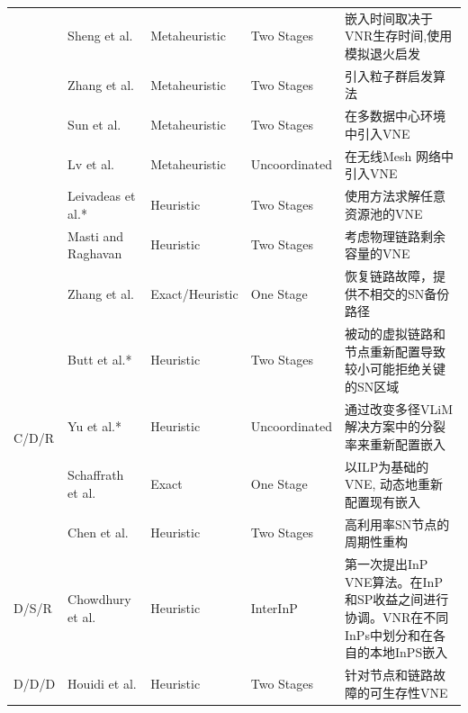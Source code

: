 \begin{longtable}[h]{@{}lm{}m{}m{}m{}}
 & Sheng et al.  \cite{zhang2011fell}  & Metaheuristic & Two Stages & 嵌入时间取决于VNR生存时间,使用模拟退火启发\\
 & Zhang et al.  \cite{zhang2013unified}  & Metaheuristic & Two Stages & 引入粒子群启发算法\\
 & Sun et al.  \cite{sun2012optimal}  & Metaheuristic & Two Stages & 在多数据中心环境中引入VNE\\
 & Lv et al.  \cite{lv2012virtual}  & Metaheuristic & Uncoordinated & 在无线Mesh 网络中引入VNE\\
 & Leivadeas et al.*  \cite{leivadeas2013efficient}  & Heuristic & Two Stages & 使用方法\cite{chowdhury2012vineyard}求解任意资源池的VNE\\
 & Masti and Raghavan  \cite{masti2012vna}  & Heuristic & Two Stages & 考虑物理链路剩余容量的VNE\\
 & Zhang et al.  \cite{zhang2012achieving}  & Exact/Heuristic & One Stage & 恢复链路故障，提供不相交的SN备份路径\\
\hline
\multirow{4}{*}{C/D/R} & Butt et al.*  \cite{butt2010topology}  & Heuristic & Two Stages & 被动的虚拟链路和节点重新配置导致较小可能拒绝关键的SN区域\\
 & Yu et al.*  \cite{yu2008rethinking}  & Heuristic & Uncoordinated & 通过改变多径VLiM 解决方案中的分裂率来重新配置嵌入\\
 & Schaffrath et al.  \cite{schaffrath2012optimizing}  & Exact& One Stage & 以ILP为基础的VNE, 动态地重新配置现有嵌入\\
 & Chen et al.  \cite{chen2011algorithm}  & Heuristic & Two Stages & 高利用率SN节点的周期性重构\\
\hline
\multirow{1}{*}{D/S/R} & Chowdhury et al.  \cite{chowdhury2010polyvine}  & Heuristic & InterInP & 第一次提出InP VNE算法。在InP 和SP收益之间进行协调。VNR在不同InPs中划分和在各自的本地InPS嵌入\\
\hline
\multirow{1}{*}{D/D/D} & Houidi et al.  \cite{houidi2010adaptive}  & Heuristic & Two Stages& 针对节点和链路故障的可生存性VNE\\
\end{longtable}
\vspace{\baselineskip}\xiaosi
\renewcommand\arraystretch{1.5}








